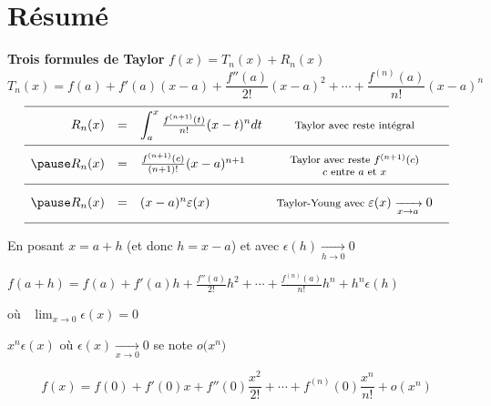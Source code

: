 
\section{Résumé}

\begin{frame}

\textbf{Trois formules de Taylor} \qquad $f(x) = T_n(x) + R_n(x)$
\pause
$$T_n(x) =f(a)+f'(a)(x-a)+\frac{f''(a)}{2!}(x-a)^2+\cdots
+\frac{f^{(n)}(a)}{n!}(x-a)^n$$
\pause
$$
\begin{array}{rcl@{\vrule depth 3ex height 4ex width 0mm \ }c}
\hline
R_n(x) & = & \displaystyle \int_a^x \tfrac{f^{(n+1)}(t)}{n!}(x-t)^ndt 
 & {\footnotesize \text{Taylor avec reste intégral}} 
 \\ \hline \pause
R_n(x) & = &\frac{f^{(n+1)}(c)}{(n+1)!}(x-a)^{n+1}   
 & {\footnotesize \begin{minipage}{0.4\textwidth}\center Taylor avec reste  $f^{(n+1)}(c)$ \\
 $c$ entre $a$ et $x$ \end{minipage}}
 \\ \hline\pause
R_n(x) & = & (x-a)^n\epsilon(x) 
 & {\footnotesize \text{Taylor-Young avec } \epsilon(x) \xrightarrow[x\to a]{} 0} \\  \hline
\end{array}
$$

\pause 

\begin{remarque}
En posant $x=a+h$ (et donc $h=x-a$) et avec $\epsilon(h) \xrightarrow[h\to 0]{} 0$

\hfil $f(a+h)=f(a)+f'(a)h+\frac{f''(a)}{2!}h^2+\cdots
+\frac{f^{(n)}(a)}{n!}h^n+h^n \epsilon(h)$
\end{remarque}

\end{frame}




\begin{frame}




où \ $\lim_{x\to0}\epsilon (x)=0$

\pause

\begin{remarque}
\hfil $x^n\epsilon(x)$ où $\epsilon(x) \xrightarrow[x\to 0]{} 0$  \quad 
se note \quad $o\big( x^n\big)$

\pause

$$f(x)= f(0)+f'(0)x+f''(0)\frac{x^2}{2!}+\cdots
+f^{(n)}(0)\frac{x^n}{n!} + o(x^n)$$
\end{remarque}

\end{frame}



